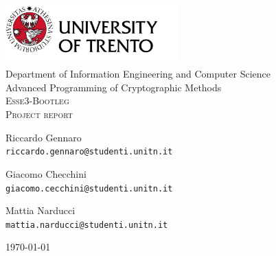 \pagestyle{plain}

\thispagestyle{empty}

\begin{center}

  \includegraphics[width=0.5\textwidth]{I-initFolder/images/maxresdefault1.jpg}\\[0.5cm]

  Department of Information Engineering and Computer Science\\[3cm]

  Advanced Programming of Cryptographic Methods\\[0.5cm]

  \textsc{\Huge Esse3-Bootleg}\\[0.5cm]

  \textsc{\Large Project report}\\[1.5cm]

  \vspace{0.5cm}
  {Riccardo Gennaro\\ \texttt{riccardo.gennaro@studenti.unitn.it} \par}
  \vspace{0.5cm}
  {Giacomo Checchini\\ \texttt{giacomo.cecchini@studenti.unitn.it} \par}
  \vspace{0.5cm}
  {Mattia Narducci\\ \texttt{mattia.narducci@studenti.unitn.it} \par}
  \vspace{2cm}

  {\today}

\end{center}%
